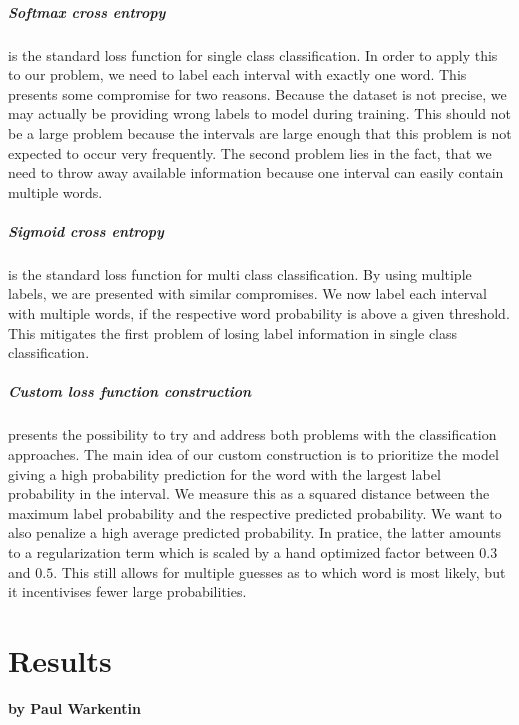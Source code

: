 \paragraph{Softmax cross entropy} is the standard loss function for single class classification. In order to apply this to our problem, we need to label each interval with exactly one word. This presents some compromise for two reasons. Because the dataset is not precise, we may actually be providing wrong labels to model during training. This should not be a large problem because the intervals are large enough that this problem is not expected to occur very frequently. The second problem lies in the fact, that we need to throw away available information because one interval can easily contain multiple words.

\paragraph{Sigmoid cross entropy} is the standard loss function for multi class classification. By using multiple labels, we are presented with similar compromises. We now label each interval with multiple words, if the respective word probability is above a given threshold. This mitigates the first problem of losing label information in single class classification.

\paragraph{Custom loss function construction} presents the possibility to try and address both problems with the classification approaches. The main idea of our custom construction is to prioritize the model giving a high probability prediction for the word with the largest label probability in the interval. We measure this as a squared distance between the maximum label probability and the respective predicted probability. We want to also penalize a high average predicted probability. In pratice, the latter amounts to a regularization term which is scaled by a hand optimized factor between $0.3$ and $0.5$. 
This still allows for multiple guesses as to which word is most likely, but it incentivises fewer large probabilities.

\chapter{Results}
\label{results}

\textbf{by Paul Warkentin} \\


